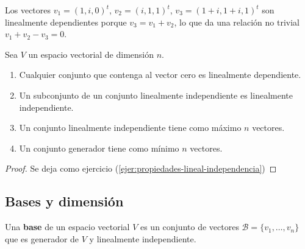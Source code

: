 \begin{eje}
  Los vectores $v_1 = (1,i,0)^t$, $v_2 = (i,1,1)^t$, $v_3 = (1+i,1+i,1)^t$ son linealmente dependientes porque $v_3 = v_1+v_2$, lo que da una relación no trivial $v_1+v_2-v_3=0$.
\end{eje}

\begin{prop}
  \label{prop:propiedades-lineal-independencia}
  Sea $V$ un espacio vectorial de dimensión $n$.
  \begin{enumerate}
    \item Cualquier conjunto que contenga al vector cero es linealmente dependiente.
    \item Un subconjunto de un conjunto linealmente independiente es linealmente independiente.
    \item Un conjunto linealmente independiente tiene como máximo $n$ vectores.
    \item Un conjunto generador tiene como mínimo $n$ vectores.
  \end{enumerate}
\end{prop}
\begin{proof}
  Se deja como ejercicio (\ref{ejer:propiedades-lineal-independencia})
\end{proof}

\subsection{Bases y dimensión}

\begin{defi}[Base]
  \label{def:base}
  Una \textbf{base} de un espacio vectorial $V$ es un conjunto de vectores $\mathcal{B}=\{v_1,\ldots,v_n\}$ que es generador de $V$ y linealmente independiente.
\end{defi}

